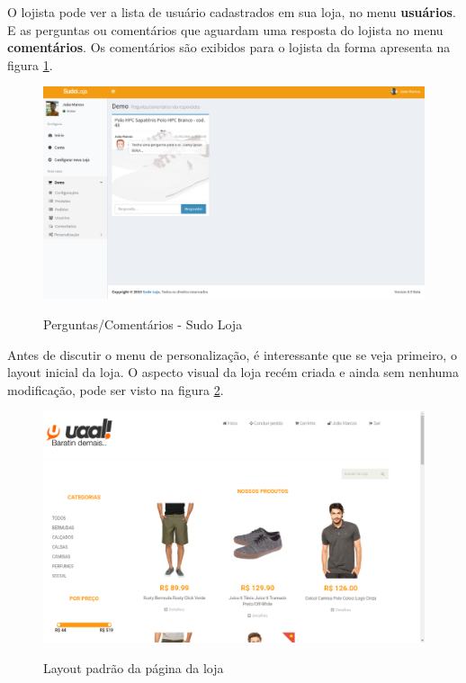 \documentclass[a4paper,12pt]{monografia}
\begin{document}
O lojista pode ver a lista de usuário cadastrados em sua loja, no menu \textbf{usuários}. E as perguntas ou comentários que aguardam uma resposta do lojista no menu \textbf{comentários}. Os comentários são exibidos para o lojista da forma apresenta na figura \ref{fig:comentarios}.

\begin{figure}[H]
\centering
\caption{Perguntas/Comentários - Sudo Loja}
\centering
\includegraphics[width=15cm]{img/sistema/comentarios.png.eps}\\
\label{fig:comentarios}
\end{figure}

Antes de discutir o menu de personalização, é interessante que se veja primeiro, o layout inicial da loja. O aspecto visual da loja recém criada e ainda sem nenhuma modificação, pode ser visto na figura \ref{fig:loja}.

\begin{figure}[H]
\centering
\caption{Layout padrão da página da loja}
\centering
\includegraphics[width=15cm]{img/sistema/loja.png.eps}\\
\label{fig:loja}
\end{figure}
\end{document}
